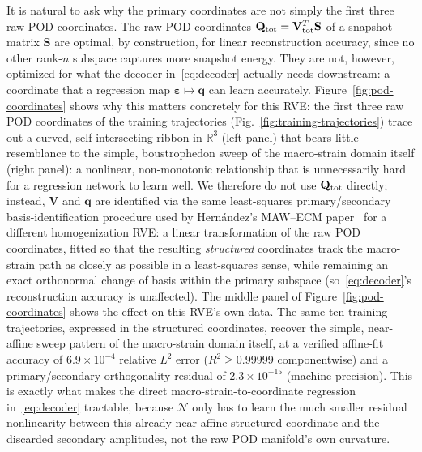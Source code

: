 \documentclass[10pt,a4paper]{article}
\begin{document}
It is natural to ask why the primary coordinates are not simply the
first three raw POD coordinates. The raw POD coordinates $\mathbf
Q_{\rm tot}=\mathbf V_{\rm tot}^T\mathbf S$
of a snapshot matrix $\mathbf S$ are optimal, by construction, for
linear reconstruction accuracy, since no other rank-$n$ subspace captures more
snapshot energy. They are not, however, optimized for what the decoder
in~\eqref{eq:decoder} actually needs downstream: a coordinate that a
regression map $\bm\varepsilon\mapsto\bm q$ can learn accurately.
Figure~\ref{fig:pod-coordinates} shows why this matters concretely for
this RVE: the first three raw POD coordinates of the training
trajectories (Fig.~\ref{fig:training-trajectories}) trace out a
curved, self-intersecting ribbon in $\mathbb R^3$ (left panel) that
bears little resemblance to the simple, boustrophedon sweep of the
macro-strain domain itself (right panel): a nonlinear, non-monotonic
relationship that is unnecessarily hard for a regression network to
learn well. We therefore do not use $\mathbf Q_{\rm tot}$ directly;
instead, $\mathbf V$ and $\bm q$ are identified via the same
least-squares primary/secondary basis-identification procedure used by
Hern\'andez's MAW--ECM paper~\cite{HernandezMAWECM} for a different
homogenization RVE: a linear transformation of the raw POD coordinates,
fitted so that the resulting \emph{structured} coordinates track the
macro-strain path as closely as possible in a least-squares sense,
while remaining an exact orthonormal change of basis within the
primary subspace (so~\eqref{eq:decoder}'s reconstruction accuracy is
unaffected). The middle panel of Figure~\ref{fig:pod-coordinates} shows
the effect on this RVE's own data. The same ten training trajectories,
expressed in the structured coordinates, recover the simple,
near-affine sweep pattern of the macro-strain domain itself, at a
verified affine-fit accuracy of $6.9\times10^{-4}$ relative
$L^2$ error ($R^2\geq0.99999$ componentwise) and a
primary/secondary orthogonality residual of
$2.3\times10^{-15}$ (machine precision). This is exactly
what makes the direct macro-strain-to-coordinate regression
in~\eqref{eq:decoder} tractable, because $\mathcal N$ only has to learn the
much smaller residual nonlinearity between this already near-affine
structured coordinate and the discarded secondary amplitudes, not the
raw POD manifold's own curvature.
\end{document}
